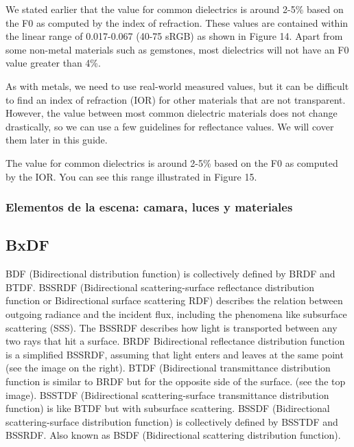             We stated earlier that the value for common dielectrics is around 2-5\% based on the F0 as computed by the index of refraction.
            These values are contained within the linear range of 0.017-0.067 (40-75 sRGB) as shown in Figure 14. Apart from some non-metal
            materials such as gemstones, most dielectrics will not have an F0 value greater than 4\%.
            
            As with metals, we need to use real-world measured values, but it can be difficult to find an index of refraction (IOR) for other
            materials that are not transparent. However, the value between most common dielectric materials does not change drastically, so
            we can use a few guidelines for reflectance values. We will cover them later in this guide.
            
            The value for common dielectrics is around 2-5\% based on the F0 as computed by the IOR. You can see this range illustrated in
            Figure 15.
        \subsubsection{Elementos de la escena: camara, luces y materiales}
        \newpage

    \subsection{BxDF}
        BDF (Bidirectional distribution function) is collectively defined by BRDF and BTDF.
        BSSRDF (Bidirectional scattering-surface reflectance distribution function or Bidirectional surface scattering RDF)
        describes the relation between outgoing radiance and the incident flux, including the phenomena like subsurface scattering (SSS).
        The BSSRDF describes how light is transported between any two rays that hit a surface.
        BRDF Bidirectional reflectance distribution function is a simplified BSSRDF, assuming that light enters and leaves at the same
        point (see the image on the right).
        BTDF (Bidirectional transmittance distribution function is similar to BRDF but for the opposite side of the surface. (see the top
        image).
        BSSTDF (Bidirectional scattering-surface transmittance distribution function) is like BTDF but with subsurface scattering.
        BSSDF (Bidirectional scattering-surface distribution function) is collectively defined by BSSTDF and BSSRDF. Also known as BSDF
        (Bidirectional scattering distribution function).

